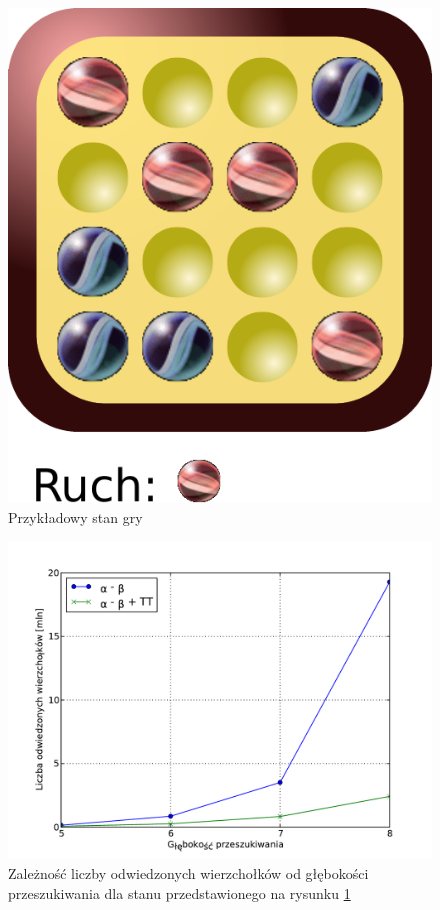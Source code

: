 \documentclass{scrartcl}
\begin{document}
\begin{figure}[h]
  \centering
  \includegraphics[scale=0.6]{data/position2.pdf}
  \caption{Przykładowy stan gry}
  \label{fig:position2}
\end{figure}

\begin{table}[h]
  \centering
  \caption{Zestawienie wyników  pomiarów wydajności algorytmów dla stanu
    przedstawionego na rysunku \ref{fig:position2}}
  \label{table:position2}
  
\end{table}

\begin{figure}[h]
  \centering
  \includegraphics[scale=0.5]{data/results2.pdf}
  \caption{Zależność liczby odwiedzonych wierzchołków od głębokości
    przeszukiwania dla stanu przedstawionego na rysunku
    \ref{fig:position2}}
  \label{fig:results2}
\end{figure}
\end{document}
